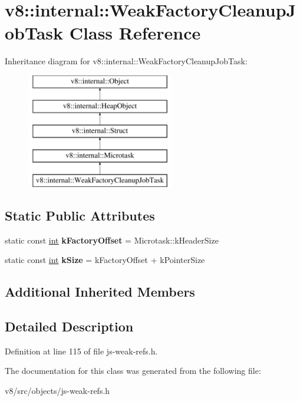 \hypertarget{classv8_1_1internal_1_1WeakFactoryCleanupJobTask}{}\section{v8\+:\+:internal\+:\+:Weak\+Factory\+Cleanup\+Job\+Task Class Reference}
\label{classv8_1_1internal_1_1WeakFactoryCleanupJobTask}
Inheritance diagram for v8\+:\+:internal\+:\+:Weak\+Factory\+Cleanup\+Job\+Task\+:\begin{figure}[H]
\begin{center}
\leavevmode
\includegraphics[height=5.000000cm]{classv8_1_1internal_1_1WeakFactoryCleanupJobTask}
\end{center}
\end{figure}
\subsection*{Static Public Attributes}
\begin{DoxyCompactItemize}
\item 
\mbox{\label{classv8_1_1internal_1_1WeakFactoryCleanupJobTask_a3cb16404a7e3fd78e2a0c12c325090db}} 
static const \mbox{\hyperlink{classint}{int}} {\bfseries k\+Factory\+Offset} = Microtask\+::k\+Header\+Size
\item 
\mbox{\label{classv8_1_1internal_1_1WeakFactoryCleanupJobTask_a63ae663ce70b589e6f0cb7e51c438698}} 
static const \mbox{\hyperlink{classint}{int}} {\bfseries k\+Size} = k\+Factory\+Offset + k\+Pointer\+Size
\end{DoxyCompactItemize}
\subsection*{Additional Inherited Members}


\subsection{Detailed Description}


Definition at line 115 of file js-\/weak-\/refs.\+h.



The documentation for this class was generated from the following file\+:\begin{DoxyCompactItemize}
\item 
v8/src/objects/js-\/weak-\/refs.\+h\end{DoxyCompactItemize}
